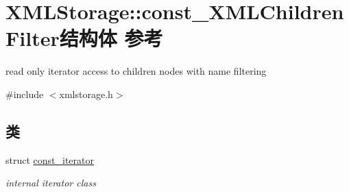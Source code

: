 \hypertarget{struct_x_m_l_storage_1_1const___x_m_l_children_filter}{}\section{X\+M\+L\+Storage\+:\+:const\+\_\+\+X\+M\+L\+Children\+Filter结构体 参考}
\label{struct_x_m_l_storage_1_1const___x_m_l_children_filter}


read only iterator access to children nodes with name filtering  




{\ttfamily \#include $<$xmlstorage.\+h$>$}

\subsection*{类}
\begin{DoxyCompactItemize}
\item 
struct \hyperlink{struct_x_m_l_storage_1_1const___x_m_l_children_filter_1_1const__iterator}{const\+\_\+iterator}
\begin{DoxyCompactList}\small\item\em internal iterator class \end{DoxyCompactList}\end{DoxyCompactItemize}
